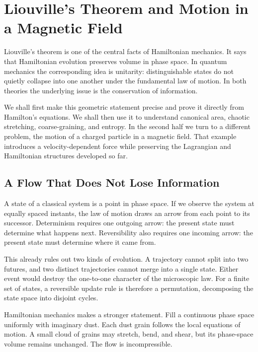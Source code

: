 \chapter{Liouville's Theorem and Motion in a Magnetic Field}

Liouville's theorem is one of the central facts of Hamiltonian mechanics. It
says that Hamiltonian evolution preserves volume in phase space. In quantum
mechanics the corresponding idea is unitarity: distinguishable states do not
quietly collapse into one another under the fundamental law of motion. In
both theories the underlying issue is the conservation of information.

We shall first make this geometric statement precise and prove it directly
from Hamilton's equations. We shall then use it to understand canonical area,
chaotic stretching, coarse-graining, and entropy. In the second half we turn
to a different problem, the motion of a charged particle in a magnetic field.
That example introduces a velocity-dependent force while preserving the
Lagrangian and Hamiltonian structures developed so far.

\section{A Flow That Does Not Lose Information}

A state of a classical system is a point in phase space. If we observe the
system at equally spaced instants, the law of motion draws an arrow from each
point to its successor. Determinism requires one outgoing arrow: the present
state must determine what happens next. Reversibility also requires one
incoming arrow: the present state must determine where it came from.

This already rules out two kinds of evolution. A trajectory cannot split into
two futures, and two distinct trajectories cannot merge into a single state.
Either event would destroy the one-to-one character of the microscopic law.
For a finite set of states, a reversible update rule is therefore a
permutation, decomposing the state space into disjoint cycles.

Hamiltonian mechanics makes a stronger statement. Fill a continuous phase
space uniformly with imaginary dust. Each dust grain follows the local
equations of motion. A small cloud of grains may stretch, bend, and shear, but
its phase-space volume remains unchanged. The flow is incompressible.

\begin{classroomqa}
\end{classroomqa}

